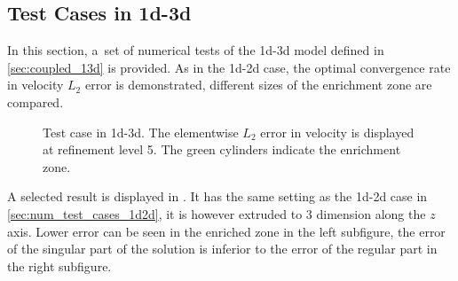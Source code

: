 \subsection{Test Cases in 1d-3d} \label{sec:num_test_cases_1d3d}
In this section, a~set of numerical tests of the 1d-3d model defined in \ref{sec:coupled_13d} is provided.
As in the 1d-2d case, the optimal convergence rate in velocity $L_2$ error is demonstrated,
different sizes of the enrichment zone are compared.

\begin{figure}[!htb]
    \centering
    \caption[Error distribution in 1d-3d.]
    {Test case in 1d-3d. The elementwise $L_2$ error in velocity is displayed at refinement level 5.
    The green cylinders indicate the enrichment zone. }
    \label{fig:mh_tc5_error}
\end{figure}
A selected result is displayed in .
It has the same setting as the 1d-2d case in \ref{sec:num_test_cases_1d2d},
it is however extruded to 3 dimension along the $z$ axis.
Lower error can be seen in the enriched zone in the left subfigure,
the error of the singular part of the solution is inferior to the error of the regular part
in the right subfigure.

